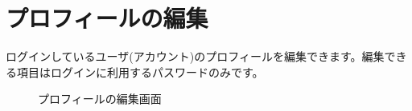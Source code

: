 \documentclass[11ptm]{jsarticle}
\begin{document}

\clearpage
\section{プロフィールの編集}
\label{sec:プロフィールの編集}
ログインしているユーザ(アカウント)のプロフィールを編集できます。編集できる項目はログインに利用するパスワードのみです。
\begin{figure}[h]
  \centering
  \caption{\label{fig:プロフィールの編集画面}プロフィールの編集画面}
\end{figure}
\end{document}
